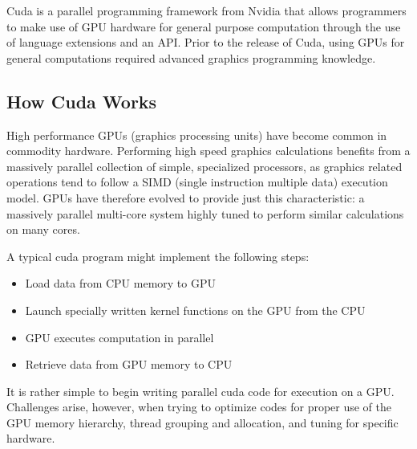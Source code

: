 Cuda is a parallel programming framework from Nvidia that allows programmers to make use of GPU hardware for general purpose computation through the use of language extensions and an API. Prior to the release of Cuda, using GPUs for general computations required advanced graphics programming knowledge. 
\subsection{How Cuda Works}
High performance GPUs (graphics processing units) have become common in commodity hardware. Performing high speed graphics calculations benefits from a massively parallel collection of simple, specialized processors, as graphics related operations tend to follow a SIMD (single instruction multiple data) execution model. GPUs have therefore evolved to provide just this characteristic: a massively parallel multi-core system highly tuned to perform similar calculations on many cores.

A typical cuda program might implement the following steps:
\begin{itemize}
    \item Load data from CPU memory to GPU
    \item Launch specially written kernel functions on the GPU from the CPU
    \item GPU executes computation in parallel
    \item Retrieve data from GPU memory to CPU
\end{itemize}

It is rather simple to begin writing parallel cuda code for execution on a GPU. Challenges arise, however, when trying to optimize codes for proper use of the GPU memory hierarchy, thread grouping and allocation, and tuning for specific hardware. 
